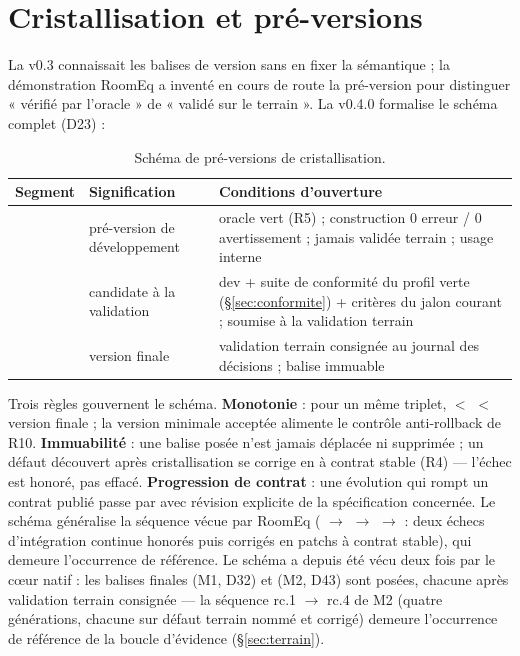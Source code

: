 \section{Cristallisation et pré-versions}\label{sec:preversions}

La v0.3 connaissait les balises de version sans en fixer la sémantique ; la démonstration
RoomEq a inventé en cours de route la pré-version  pour distinguer « vérifié
par l’oracle » de « validé sur le terrain ». La v0.4.0 formalise le schéma complet (D23) :

\begin{table}[htbp]
\centering\small
\caption{Schéma de pré-versions de cristallisation.}
\label{tab:preversions}
\begin{tabularx}{\textwidth}{@{}l l Y@{}}
\toprule
\textbf{Segment} & \textbf{Signification} & \textbf{Conditions d’ouverture} \\
\midrule
{} & pré-version de développement & oracle vert (R5) ; construction
0 erreur / 0 avertissement ; jamais validée terrain ; usage interne \\
 & candidate à la validation & dev + suite de conformité du profil
verte (§\ref{sec:conformite}) + critères du jalon courant ; soumise à la validation
terrain \\
 & version finale & validation terrain consignée au journal des décisions ;
balise immuable \\
\bottomrule
\end{tabularx}
\end{table}

Trois règles gouvernent le schéma. \textbf{Monotonie} : pour un même triplet,
 $<$  $<$ version finale ; la version minimale acceptée alimente
le contrôle anti-rollback de R10. \textbf{Immuabilité} : une balise posée n’est jamais
déplacée ni supprimée ; un défaut découvert après cristallisation se corrige en
 à contrat stable (R4) — l’échec est honoré, pas effacé.
\textbf{Progression de contrat} : une évolution qui rompt un contrat publié passe par
 avec révision explicite de la spécification concernée. Le schéma
généralise la séquence vécue par RoomEq ( $\to$  $\to$
 $\to$  : deux échecs d’intégration continue honorés puis
corrigés en patchs à contrat stable), qui demeure l’occurrence de référence. Le schéma
a depuis été vécu deux fois par le cœur natif : les balises finales  (M1,
D32) et  (M2, D43) sont posées, chacune après validation terrain consignée
— la séquence rc.1 $\to$ rc.4 de M2 (quatre générations, chacune sur défaut terrain
nommé et corrigé) demeure l’occurrence de référence de la boucle d’évidence
(§\ref{sec:terrain}).

